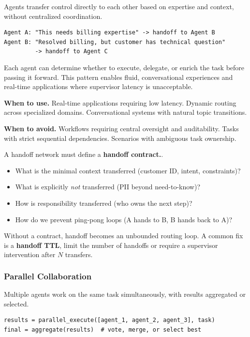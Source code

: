 Agents transfer control directly to each other based on expertise and context, without centralized coordination.

{\footnotesize
\begin{verbatim}
Agent A: "This needs billing expertise" -> handoff to Agent B
Agent B: "Resolved billing, but customer has technical question" 
         -> handoff to Agent C
\end{verbatim}
}

Each agent can determine whether to execute, delegate, or enrich the task before passing it forward. This pattern enables fluid, conversational experiences and real-time applications where supervisor latency is unacceptable.

\textbf{When to use.} Real-time applications requiring low latency. Dynamic routing across specialized domains. Conversational systems with natural topic transitions.

\textbf{When to avoid.} Workflows requiring central oversight and auditability. Tasks with strict sequential dependencies. Scenarios with ambiguous task ownership.

A handoff network must define a \textbf{handoff contract.}.
\begin{itemize}
\item What is the minimal context transferred (customer ID, intent, constraints)?
\item What is explicitly \textit{not} transferred (PII beyond need-to-know)?
\item How is responsibility transferred (who owns the next step)?
\item How do we prevent ping-pong loops (A hands to B, B hands back to A)?
\end{itemize}
Without a contract, handoff becomes an unbounded routing loop. A common fix is a \textbf{handoff TTL}, limit the number of handoffs or require a supervisor intervention after $N$ transfers.

\subsubsection{Parallel Collaboration}

Multiple agents work on the same task simultaneously, with results aggregated or selected.

{\footnotesize
\begin{verbatim}
results = parallel_execute([agent_1, agent_2, agent_3], task)
final = aggregate(results)  # vote, merge, or select best
\end{verbatim}
}

